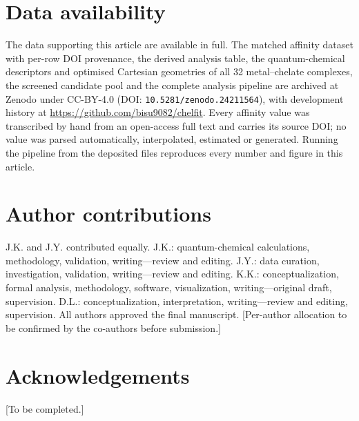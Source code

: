 \documentclass[twoside,twocolumn,9pt]{article}
\begin{document}
\section*{Data availability}
The data supporting this article are available in full. The matched affinity dataset with per-row DOI provenance, the derived analysis table, the quantum-chemical descriptors and optimised Cartesian geometries of all 32 metal--chelate complexes, the screened candidate pool and the complete analysis pipeline are archived at Zenodo under CC-BY-4.0 (DOI: \texttt{10.5281/zenodo.24211564}), with development history at \url{https://github.com/bisu9082/chelfit}. Every affinity value was transcribed by hand from an open-access full text and carries its source DOI; no value was parsed automatically, interpolated, estimated or generated. Running the pipeline from the deposited files reproduces every number and figure in this article.

\section*{Author contributions}
J.K. and J.Y. contributed equally. J.K.: quantum-chemical calculations, methodology, validation, writing---review and editing. J.Y.: data curation, investigation, validation, writing---review and editing. K.K.: conceptualization, formal analysis, methodology, software, visualization, writing---original draft, supervision. D.L.: conceptualization, interpretation, writing---review and editing, supervision. All authors approved the final manuscript. [Per-author allocation to be confirmed by the co-authors before submission.]

\section*{Acknowledgements}
[To be completed.]

\balance
\renewcommand\refname{Notes and references}


\end{document}
